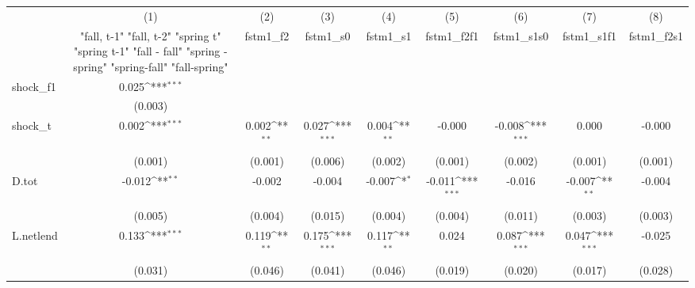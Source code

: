 {
\def\sym#1{\ifmmode^{#1}\else\(^{#1}\)\fi}
\begin{tabular}{l*{8}{c}}
\toprule
            &\multicolumn{1}{c}{(1)}&\multicolumn{1}{c}{(2)}&\multicolumn{1}{c}{(3)}&\multicolumn{1}{c}{(4)}&\multicolumn{1}{c}{(5)}&\multicolumn{1}{c}{(6)}&\multicolumn{1}{c}{(7)}&\multicolumn{1}{c}{(8)}\\
            &\multicolumn{1}{c}{  "fall, t-1" "fall, t-2" "spring t" "spring t-1"  "fall - fall" "spring - spring" "spring-fall" "fall-spring" }&\multicolumn{1}{c}{fstm1\_f2}&\multicolumn{1}{c}{fstm1\_s0}&\multicolumn{1}{c}{fstm1\_s1}&\multicolumn{1}{c}{fstm1\_f2f1}&\multicolumn{1}{c}{fstm1\_s1s0}&\multicolumn{1}{c}{fstm1\_s1f1}&\multicolumn{1}{c}{fstm1\_f2s1}\\
\midrule
shock\_f1    &       0.025\sym{***}&                     &                     &                     &                     &                     &                     &                     \\
            &     (0.003)         &                     &                     &                     &                     &                     &                     &                     \\
\addlinespace
shock\_t     &       0.002\sym{***}&       0.002\sym{**} &       0.027\sym{***}&       0.004\sym{**} &      -0.000         &      -0.008\sym{***}&       0.000         &      -0.000         \\
            &     (0.001)         &     (0.001)         &     (0.006)         &     (0.002)         &     (0.001)         &     (0.002)         &     (0.001)         &     (0.001)         \\
\addlinespace
D.tot       &      -0.012\sym{**} &      -0.002         &      -0.004         &      -0.007\sym{*}  &      -0.011\sym{***}&      -0.016         &      -0.007\sym{**} &      -0.004         \\
            &     (0.005)         &     (0.004)         &     (0.015)         &     (0.004)         &     (0.004)         &     (0.011)         &     (0.003)         &     (0.003)         \\
\addlinespace
L.netlend   &       0.133\sym{***}&       0.119\sym{**} &       0.175\sym{***}&       0.117\sym{**} &       0.024         &       0.087\sym{***}&       0.047\sym{***}&      -0.025         \\
            &     (0.031)         &     (0.046)         &     (0.041)         &     (0.046)         &     (0.019)         &     (0.020)         &     (0.017)         &     (0.028)         \\

\end{tabular}}
